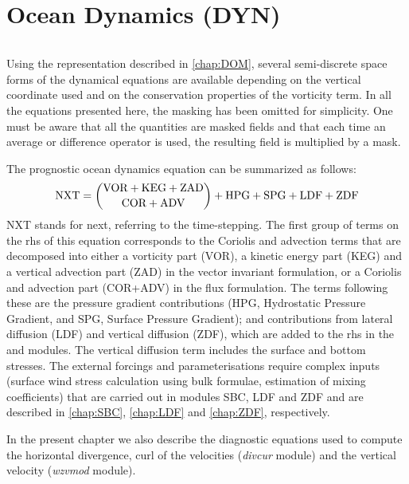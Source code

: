 \documentclass[../tex_main/NEMO_manual]{subfiles}
\begin{document}
\chapter{Ocean Dynamics (DYN)}
\label{chap:DYN}
\minitoc

$\ $\newline      %

Using the representation described in \autoref{chap:DOM},
several semi-discrete space forms of the dynamical equations are available depending on
the vertical coordinate used and on the conservation properties of the vorticity term.
In all the equations presented here, the masking has been omitted for simplicity.
One must be aware that all the quantities are masked fields and
that each time an average or difference operator is used, the resulting field is multiplied by a mask.

The prognostic ocean dynamics equation can be summarized as follows:
\begin{equation*}
\text{NXT} = \dbinom	{\text{VOR} + \text{KEG} + \text {ZAD} }
						{\text{COR} + \text{ADV}                       }
			+ \text{HPG} + \text{SPG} + \text{LDF} + \text{ZDF}
\end{equation*}
NXT stands for next, referring to the time-stepping.
The first group of terms on the rhs of this equation corresponds to the Coriolis and advection terms that
are decomposed into either a vorticity part (VOR), a kinetic energy part (KEG) and
a vertical advection part (ZAD) in the vector invariant formulation,
or a Coriolis and advection part (COR+ADV) in the flux formulation.
The terms following these are the pressure gradient contributions
(HPG, Hydrostatic Pressure Gradient, and SPG, Surface Pressure Gradient);
and contributions from lateral diffusion (LDF) and vertical diffusion (ZDF),
which are added to the rhs in the  and  modules.
The vertical diffusion term includes the surface and bottom stresses.
The external forcings and parameterisations require complex inputs
(surface wind stress calculation using bulk formulae, estimation of mixing coefficients)
that are carried out in modules SBC, LDF and ZDF and are described in
\autoref{chap:SBC}, \autoref{chap:LDF} and \autoref{chap:ZDF}, respectively. 

In the present chapter we also describe the diagnostic equations used to compute the horizontal divergence,
curl of the velocities (\emph{divcur} module) and the vertical velocity (\emph{wzvmod} module).
\end{document}
